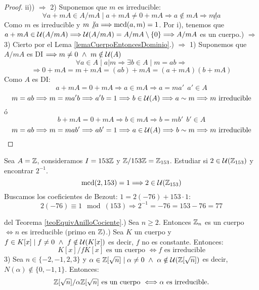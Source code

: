 \begin{teo}
\begin{proof}
    ii)) $\Longrightarrow$ 2) Suponemos que $m$ es irreducible:
    $$\forall a+mA \in A/mA \mid a+mA \neq 0+mA \Longrightarrow a\notin mA \Longrightarrow m\not|a$$
    Como $m$ es irreducible y $m\not|a \Longrightarrow \operatorname{mcd}(a,m)=1$.\newline
    Por i), tenemos que $a+mA \in \mathcal{U}(A/mA) \Longrightarrow \mathcal{U}(A/mA) = A/mA \setminus\{0\} \Longrightarrow A/mA$ es un cuerpo.) $\Longrightarrow$ 3) Cierto por el Lema \ref{lemaCuerpoEntoncesDominio}.) $\Longrightarrow$ 1) Suponemos que $A/mA$ es DI $\Longrightarrow m\neq 0 \ \land \  m\notin \mathcal{U}(A)$
    $$\forall a \in A \mid a|m \Longrightarrow \exists b \in A \mid m=ab \Longrightarrow $$
    $$\Longrightarrow 0+mA = m+mA = (ab)+mA = (a+mA)(b+mA)$$
    Como $A$ es DI:
    $$a+mA = 0+mA \Longrightarrow a\in mA \Longrightarrow a=ma'~~a' \in A$$
    $$m=ab \Longrightarrow m=ma'b \Longrightarrow a'b=1 \Longrightarrow b\in \mathcal{U}(A) \Longrightarrow a\sim m \Longrightarrow m \mbox{ irreducible}$$
    ó
    $$b+mA = 0+mA \Longrightarrow b\in mA \Longrightarrow b=mb'~~b'\in A$$
    $$m=ab \Longrightarrow m=mab' \Longrightarrow ab'=1 \Longrightarrow a\in \mathcal{U}(A) \Longrightarrow b\sim m \Longrightarrow m \mbox{ irreducible}$$
\end{proof}
\end{teo}

\begin{ejemplo}
    Sea $A=\mathbb Z$, consideramos $I=153\mathbb Z$ y $\mathbb Z/153\mathbb Z=\mathbb Z_{153}$.\newline
    Estudiar si $2 \in \mathcal{U}(\mathbb Z_{153})$ y encontrar $2^{-1}$.\\

    
    $$\operatorname{mcd}(2,153)=1 \Longrightarrow 2 \in \mathcal{U}(\mathbb Z_{153})$$
    Buscamos los coeficientes de Bezout: $1=2(-76)+153\cdot 1$:
    $$2(-76)\equiv 1\mod(153) \Longrightarrow 2^{-1} = -76 = 153-76 = 77$$
\end{ejemplo}

\begin{coro}
    del Teorema \ref{teoEquivAnilloCociente}.) Sea $n\geq 2$. Entonces $\mathbb Z_n$ es un cuerpo $\Longleftrightarrow n$ es irreducible $($primo en $\mathbb Z)$.) Sea $K$ un cuerpo y $f \in K[x] \mid f\neq 0 \ \land \  f\notin \mathcal{U}(K[x])$ es decir, $f$ no es constante. Entonces:
    $$K[x]/fK[x] \mbox{ es un cuerpo } \Longleftrightarrow f \mbox{ es irreducible}$$
    3) Sea $n\in \{-2, -1, 2, 3\}$ y $\alpha \in \mathbb Z[\sqrt{n}] \mid \alpha \neq 0 \ \land \  \alpha \notin \mathcal{U}(\mathbb Z[\sqrt{n}])$ es decir,
    $N(\alpha) \notin \{0, -1, 1\}$. Entonces:
    $$\mathbb Z[\sqrt{n}]/\alpha \mathbb Z[\sqrt{n}] \mbox{ es un cuerpo } \Longleftrightarrow \alpha \mbox{ es irreducible.}$$
\end{coro}~\\

